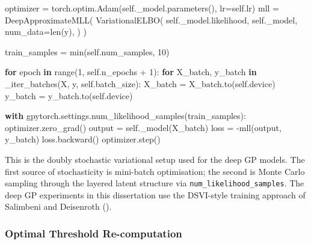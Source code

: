 \documentclass[
  letterpaper,
  DIV=11,
  numbers=noendperiod]{scrartcl}
\newenvironment{Shaded}{\begin{snugshade}}{\end{snugshade}}
\newcommand{\BuiltInTok}[1]{\textcolor[rgb]{0.00,0.23,0.31}{#1}}
\newcommand{\ControlFlowTok}[1]{\textcolor[rgb]{0.00,0.23,0.31}{\textbf{#1}}}
\newcommand{\DecValTok}[1]{\textcolor[rgb]{0.68,0.00,0.00}{#1}}
\newcommand{\KeywordTok}[1]{\textcolor[rgb]{0.00,0.23,0.31}{\textbf{#1}}}
\newcommand{\NormalTok}[1]{\textcolor[rgb]{0.00,0.23,0.31}{#1}}
\newcommand{\OperatorTok}[1]{\textcolor[rgb]{0.37,0.37,0.37}{#1}}
\newcommand{\VariableTok}[1]{\textcolor[rgb]{0.07,0.07,0.07}{#1}}
\begin{document}
\begin{Shaded}
\begin{Highlighting}[]
\NormalTok{optimizer }\OperatorTok{=}\NormalTok{ torch.optim.Adam(}\VariableTok{self}\NormalTok{.\_model.parameters(), lr}\OperatorTok{=}\VariableTok{self}\NormalTok{.lr)}
\NormalTok{mll }\OperatorTok{=}\NormalTok{ DeepApproximateMLL(}
\NormalTok{    VariationalELBO(}
        \VariableTok{self}\NormalTok{.\_model.likelihood,}
        \VariableTok{self}\NormalTok{.\_model,}
\NormalTok{        num\_data}\OperatorTok{=}\BuiltInTok{len}\NormalTok{(y),}
\NormalTok{    )}
\NormalTok{)}

\NormalTok{train\_samples }\OperatorTok{=} \BuiltInTok{min}\NormalTok{(}\VariableTok{self}\NormalTok{.num\_samples, }\DecValTok{10}\NormalTok{)}

\ControlFlowTok{for}\NormalTok{ epoch }\KeywordTok{in} \BuiltInTok{range}\NormalTok{(}\DecValTok{1}\NormalTok{, }\VariableTok{self}\NormalTok{.n\_epochs }\OperatorTok{+} \DecValTok{1}\NormalTok{):}
    \ControlFlowTok{for}\NormalTok{ X\_batch, y\_batch }\KeywordTok{in}\NormalTok{ \_iter\_batches(X, y, }\VariableTok{self}\NormalTok{.batch\_size):}
\NormalTok{        X\_batch }\OperatorTok{=}\NormalTok{ X\_batch.to(}\VariableTok{self}\NormalTok{.device)}
\NormalTok{        y\_batch }\OperatorTok{=}\NormalTok{ y\_batch.to(}\VariableTok{self}\NormalTok{.device)}

        \ControlFlowTok{with}\NormalTok{ gpytorch.settings.num\_likelihood\_samples(train\_samples):}
\NormalTok{            optimizer.zero\_grad()}
\NormalTok{            output }\OperatorTok{=} \VariableTok{self}\NormalTok{.\_model(X\_batch)}
\NormalTok{            loss   }\OperatorTok{=} \OperatorTok{{-}}\NormalTok{mll(output, y\_batch)}
\NormalTok{            loss.backward()}
\NormalTok{            optimizer.step()}
\end{Highlighting}
\end{Shaded}

This is the doubly stochastic variational setup used for the deep GP
models. The first source of stochasticity is mini-batch optimisation;
the second is Monte Carlo sampling through the layered latent structure
via \texttt{num\_likelihood\_samples}. The deep GP experiments in this
dissertation use the DSVI-style training approach of Salimbeni and
Deisenroth ().

\subsubsection{Optimal Threshold
Re-computation}\label{sec-credit-risk-regen-snippet}
\end{document}
